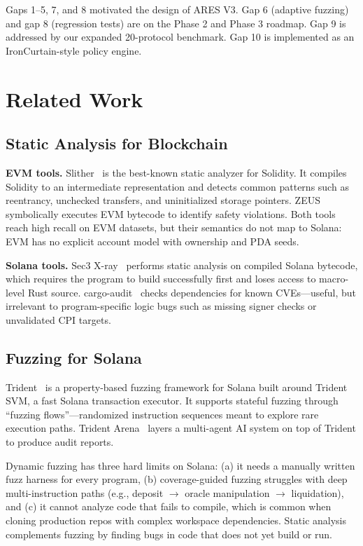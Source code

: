 \documentclass{article}
\begin{document}
Gaps 1--5, 7, and 8 motivated the design of ARES V3. Gap 6 (adaptive fuzzing) and gap 8 (regression tests) are on the Phase 2 and Phase 3 roadmap. Gap 9 is addressed by our expanded 20-protocol benchmark. Gap 10 is implemented as an IronCurtain-style policy engine.


\section{Related Work}
\label{sec:related}

\subsection{Static Analysis for Blockchain}

\textbf{EVM tools.} Slither~\citep{feist2019slither} is the best-known static analyzer for Solidity. It compiles Solidity to an intermediate representation and detects common patterns such as reentrancy, unchecked transfers, and uninitialized storage pointers. ZEUS~\citep{kalra2018zeus} symbolically executes EVM bytecode to identify safety violations. Both tools reach high recall on EVM datasets, but their semantics do not map to Solana: EVM has no explicit account model with ownership and PDA seeds.

\textbf{Solana tools.} Sec3 X-ray~\citep{sec32026xray} performs static analysis on compiled Solana bytecode, which requires the program to build successfully first and loses access to macro-level Rust source. cargo-audit~\citep{trailofbits2026cargo_audit} checks dependencies for known CVEs---useful, but irrelevant to program-specific logic bugs such as missing signer checks or unvalidated CPI targets.

\subsection{Fuzzing for Solana}

Trident~\citep{ackee2026trident} is a property-based fuzzing framework for Solana built around Trident SVM, a fast Solana transaction executor. It supports stateful fuzzing through ``fuzzing flows''---randomized instruction sequences meant to explore rare execution paths. Trident Arena~\citep{ackee2026trident_arena} layers a multi-agent AI system on top of Trident to produce audit reports.

Dynamic fuzzing has three hard limits on Solana: (a) it needs a manually written fuzz harness for every program, (b) coverage-guided fuzzing struggles with deep multi-instruction paths (e.g., deposit $\to$ oracle manipulation $\to$ liquidation), and (c) it cannot analyze code that fails to compile, which is common when cloning production repos with complex workspace dependencies. Static analysis complements fuzzing by finding bugs in code that does not yet build or run.
\end{document}
